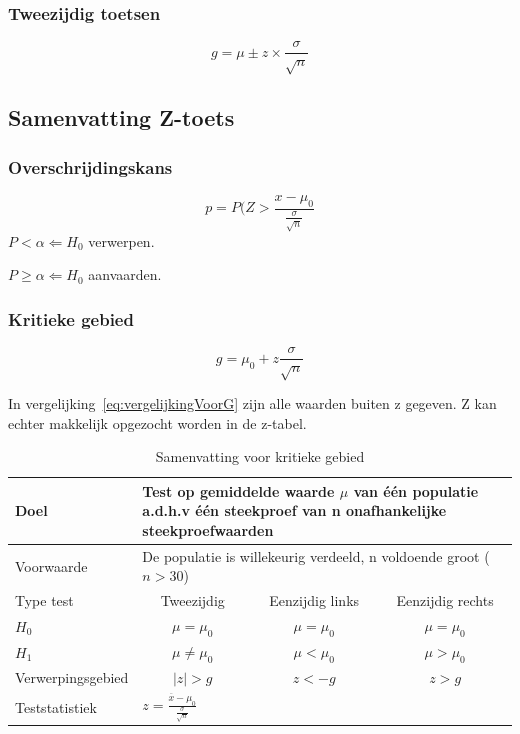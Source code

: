 \documentclass[a4paper,12pt]{article}
\begin{document}
\subsubsection{Tweezijdig toetsen}
\begin{equation}
g=\mu \pm z \times \frac{\sigma}{\sqrt{n}}
\end{equation}

\subsection{Samenvatting Z-toets}
\subsubsection{Overschrijdingskans}
\begin{equation}
p=P(Z>\frac{x-\mu_0}{\frac{\sigma}{\sqrt{n}}}
\end{equation}
$P<\alpha \Leftarrow H_0 $ verwerpen.

$P\geq \alpha \Leftarrow H_0$ aanvaarden.
\subsubsection{Kritieke gebied}
\begin{equation}
g=\mu_0 + z\frac{\sigma}{\sqrt{n}}
\label{eq:vergelijkingVoorG}
\end{equation}

In vergelijking~\ref{eq:vergelijkingVoorG} zijn alle waarden buiten z gegeven. Z kan echter makkelijk opgezocht worden in de z-tabel.

\begin{table}[H]
\centering
\begin{tabular}{l c c c}
Doel & \multicolumn{3}{l}{
\begin{minipage}{11cm}
Test op gemiddelde waarde $\mu$ van één populatie a.d.h.v één steekproef van n onafhankelijke steekproefwaarden
\end{minipage}
}\\
\hline
Voorwaarde & \multicolumn{3}{l}{De populatie is willekeurig verdeeld, n voldoende groot ($n>30$)}\\
\hline
Type test & Tweezijdig & Eenzijdig links & Eenzijdig rechts\\
\hline
$H_0$ & $\mu = \mu_0$ & $\mu = \mu_0$ & $\mu = \mu_0$\\
$H_1$ & $\mu \neq \mu_0$ & $\mu < \mu_0$ & $\mu >\mu_0$ \\
Verwerpingsgebied & $|z| > g $ & $z<-g$ & $z>g$\\
Teststatistiek & \multicolumn{3}{l}{$z=\frac{\overline{x}-\mu_0}{\frac{\sigma}{\sqrt{n}}}$} \\
\hline
\end{tabular}
\caption{Samenvatting  voor kritieke gebied}
\label{tab:kritiekeGebied}
\end{table}
\end{document}
